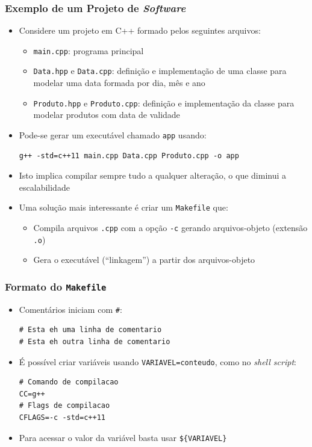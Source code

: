 \documentclass[aspectratio=169]{beamer}
\begin{document}
\begin{frame}[fragile]\frametitle{Exemplo de um Projeto de \emph{Software}}
\begin{itemize}
	\item Considere um projeto em C++ formado pelos seguintes arquivos:
	\begin{itemize}
		\item \texttt{main.cpp}: programa principal
		\item \texttt{Data.hpp} e \texttt{Data.cpp}: definição e implementação de uma classe para modelar uma data formada por dia, mês e ano
		\item \texttt{Produto.hpp} e \texttt{Produto.cpp}: definição e implementação da classe para modelar produtos com data de validade
	\end{itemize}
	\item Pode-se gerar um executável chamado \texttt{app} usando:
\begin{lstlisting}
g++ -std=c++11 main.cpp Data.cpp Produto.cpp -o app
\end{lstlisting}
	\item Isto implica compilar sempre tudo a qualquer alteração, o que diminui a escalabilidade
	\item Uma solução mais interessante é criar um \texttt{Makefile} que:
	\begin{itemize}
		\item Compila arquivos \texttt{.cpp} com a opção \texttt{-c} gerando arquivos-objeto (extensão \texttt{.o})
		\item Gera o executável (``linkagem'') a partir dos arquivos-objeto
	\end{itemize}
\end{itemize}
\end{frame}

\begin{frame}[fragile]\frametitle{Formato do \texttt{Makefile}}
\begin{itemize}
	\item Comentários iniciam com \texttt{\#}:
\begin{lstlisting}
# Esta eh uma linha de comentario
# Esta eh outra linha de comentario
\end{lstlisting}
	\item É possível criar variáveis usando \texttt{VARIAVEL=conteudo}, como no \emph{shell script}:
\begin{lstlisting}
# Comando de compilacao
CC=g++
# Flags de compilacao
CFLAGS=-c -std=c++11
\end{lstlisting}
	\item Para acessar o valor da variável basta usar \texttt{\$\{VARIAVEL\}}
\end{itemize}
\end{frame}
\end{document}
